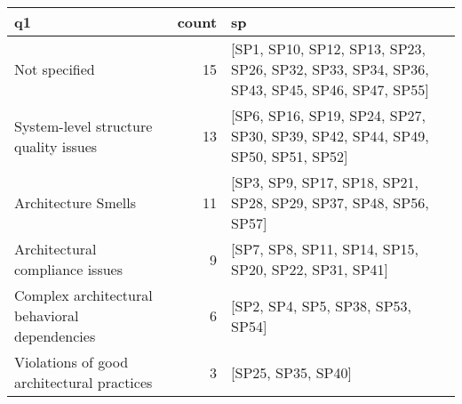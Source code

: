 \begin{tabular}{lrl}
\toprule
                                            q1 &  count &                                                                                         sp \\
\midrule
                                 Not specified &     15 &  [SP1, SP10, SP12, SP13, SP23, SP26, SP32, SP33, SP34, SP36, SP43, SP45, SP46, SP47, SP55] \\
         System-level structure quality issues &     13 &              [SP6, SP16, SP19, SP24, SP27, SP30, SP39, SP42, SP44, SP49, SP50, SP51, SP52] \\
                           Architecture Smells &     11 &                           [SP3, SP9, SP17, SP18, SP21, SP28, SP29, SP37, SP48, SP56, SP57] \\
               Architectural compliance issues &      9 &                                       [SP7, SP8, SP11, SP14, SP15, SP20, SP22, SP31, SP41] \\
 Complex architectural behavioral dependencies &      6 &                                                          [SP2, SP4, SP5, SP38, SP53, SP54] \\
    Violations of good architectural practices &      3 &                                                                         [SP25, SP35, SP40] \\
\bottomrule
\end{tabular}
